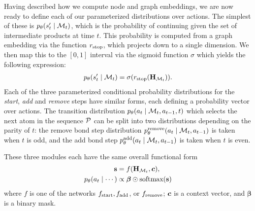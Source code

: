 Having described how we compute node and graph embeddings, we are now ready to define each of our parameterized distributions over actions.
The simplest of these is $p_\theta(s'_t \mid {\mathcal{M}}_t)$, which is the probability of continuing given the set of intermediate products at time $t$. 
This probability is computed from a graph embedding via the function $r_{\textrm{stop}}$, which projects down to a single dimension. We then map this to the $[0,1]$ interval via the sigmoid function $\sigma$ which yields the following expression:
\begin{align}
p_\theta(s'_t \mid {\mathcal{M}}_t) = \sigma(r_{\textrm{stop}}({\mathbf{H}}_{{\mathcal{M}}_t})).
\end{align}
%
Each of the three parameterized conditional probability distributions for the {\em start}, {\em add} and {\em remove} steps have similar forms, each defining a probability vector over actions.
The transition distribution $p_\theta(a_t \mid  {\mathcal{M}}_t, a_{t-1}, t)$ 
which selects the next atom in the sequence ${\mathcal{P}}$
can be split into two distributions depending on the parity of $t$:
the remove bond step distribution $p_\theta^\textrm{remove}(a_t \mid  {\mathcal{M}}_t, a_{t-1})$ is taken when $t$ is odd, 
and the add bond step $p_\theta^\textrm{add}(a_t \mid {\mathcal{M}}_t, a_{t-1})$ is taken when $t$ is even. 

These three modules each have the same overall functional form
\begin{align}
\textbf{s} &= f({\mathbf{H}}_{{\mathcal{M}}_t}, \bm{c}), \\
p_\theta(a_t \mid \cdots) &\propto \bm{\beta} \odot \mbox{softmax}(\bm{\textbf{s}})
\end{align}
where $f$ is one of the networks $f_{\textrm{start}}, f_{\textrm{add}}$, or $f_{\textrm{remove}}$; 
$\bm{c}$ is a context vector, and $\bm{\beta}$ is a binary mask.

